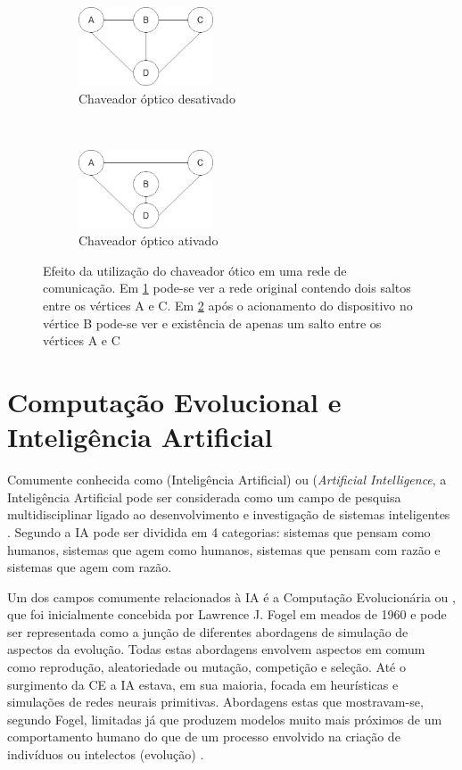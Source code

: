 \begin{figure}[t!]
	\centering
	\begin{subfigure}[t]{0.4\textwidth}
		\centering
		\includegraphics[width=4cm]{./figuras/Bypass-exemplo-A.png} %
		\caption{Chaveador óptico desativado}
		\label{fig_bypass_exemplo_A}
	\end{subfigure}%
	~
	\begin{subfigure}[t]{0.4\textwidth}
		\centering
		\includegraphics[width=4cm]{./figuras/Bypass-exemplo-B.png} %
	\caption{Chaveador óptico ativado}
	\label{fig_bypass_exemplo_B}
	\end{subfigure}
	\caption[Exemplo de atuação de \emph{by-pass} óptico]{Efeito da utilização do chaveador ótico em uma rede de comunicação. Em \ref{fig_bypass_exemplo_A} pode-se ver a rede original contendo dois saltos entre os vértices A e C. Em \ref{fig_bypass_exemplo_B} após o acionamento do dispositivo no vértice B pode-se ver e existência de apenas um salto entre os vértices A e C}
	\label{fig-bypass-exemplo}
\end{figure}

\section{Computação Evolucional e Inteligência Artificial}
Comumente conhecida como  (Inteligência Artificial) ou  (\emph{Artificial Intelligence}, a Inteligência Artificial pode ser considerada como um campo de pesquisa multidisciplinar ligado ao desenvolvimento e investigação de sistemas inteligentes \cite{Book-Brownlee2011}. Segundo \cite{Book-Russel2009} a IA pode ser dividida em 4 categorias: sistemas que pensam como humanos, sistemas que agem como humanos, sistemas que pensam com razão e sistemas que agem com razão.

Um dos campos comumente relacionados à IA é a Computação Evolucionária ou , que foi inicialmente concebida por Lawrence J. Fogel em meados de 1960 e pode ser representada como a junção de diferentes abordagens de simulação de aspectos da evolução. Todas estas abordagens envolvem aspectos em comum como reprodução, aleatoriedade ou mutação, competição e seleção. Até o surgimento da CE a IA estava, em sua maioria, focada em heurísticas e simulações de redes neurais primitivas. Abordagens estas que mostravam-se, segundo Fogel, limitadas já que produzem modelos muito mais próximos de um comportamento humano do que de um processo envolvido na criação de indivíduos ou intelectos (evolução) \cite{Book-Back2000}.

